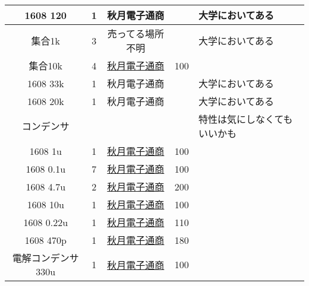 \documentclass[12pt,a4paper,dvipdfmx]{ujarticle}
\begin{document}
\begin{tabular}{ccccl}
	\hline
	1608 120&1&秋月電子通商 & &大学においてある\\
	\hline
	集合1k& 3 &売ってる場所不明 & &大学においてある\\
	\hline
	集合10k & 4 & \href{https://akizukidenshi.com/catalog/g/gP-04664/}{秋月電子通商}&100&\\
	\hline
	1608 33k&1& 秋月電子通商 & &大学においてある\\
	\hline
	1608 20k&1& 秋月電子通商 & &大学においてある\\
	\hline
	コンデンサ & & & &特性は気にしなくてもいいかも\\
	\hline
	1608 1u & 1 & \href{https://akizukidenshi.com/catalog/g/gP-14526/}{秋月電子通商}& 100 & \\
	\hline
	1608 0.1u & 7 & \href{https://akizukidenshi.com/catalog/g/gP-13374/}{秋月電子通商}& 100 & \\
	\hline
	1608 4.7u & 2 & \href{https://akizukidenshi.com/catalog/g/gP-09218/}{秋月電子通商}& 200 & \\
	\hline
	1608 10u & 1 & \href{https://akizukidenshi.com/catalog/g/gP-13336/}{秋月電子通商}& 100 & \\
	\hline
	1608 0.22u & 1 & \href{https://akizukidenshi.com/catalog/g/gP-14574/}{秋月電子通商}& 110 & \\
	\hline
	1608 470p & 1 & \href{https://akizukidenshi.com/catalog/g/gP-09268/}{秋月電子通商}& 180 & \\
	\hline
	電解コンデンサ 330u &1&\href{https://akizukidenshi.com/catalog/g/gP-04648/}{秋月電子通商}&100&\\
	\hline
\end{tabular}
\end{document}
